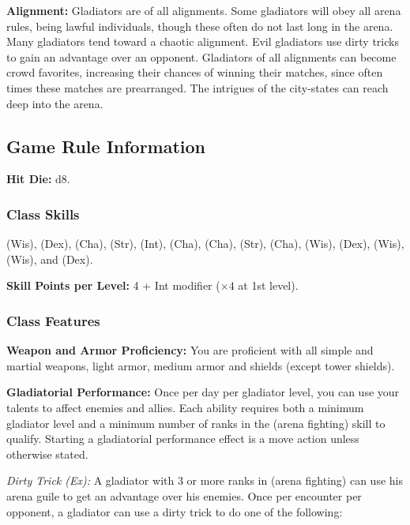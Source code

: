 \textbf{Alignment:} Gladiators are of all alignments. Some gladiators will obey all arena rules, being lawful individuals, though these often do not last long in the arena. Many gladiators tend toward a chaotic alignment. Evil gladiators use dirty tricks to gain an advantage over an opponent. Gladiators of all alignments can become crowd favorites, increasing their chances of winning their matches, since often times these matches are prearranged. The intrigues of the city-states can reach deep into the arena.

\subsection{Game Rule Information}

\textbf{Hit Die:} d8.

\subsubsection{Class Skills}
 (Wis),  (Dex),  (Cha),  (Str),  (Int),  (Cha),  (Cha),  (Str),  (Cha),  (Wis),  (Dex),  (Wis),  (Wis), and  (Dex).

\textbf{Skill Points per Level:} 4 + Int modifier ($\times4$ at 1st level).

\subsubsection{Class Features}

\textbf{Weapon and Armor Proficiency:} You are proficient with all simple and martial weapons, light armor, medium armor and shields (except tower shields).

\textbf{Gladiatorial Performance:} Once per day per gladiator level, you can use your talents to affect enemies and allies. Each ability requires both a minimum gladiator level and a minimum number of ranks in the  (arena fighting) skill to qualify. Starting a gladiatorial performance effect is a move action unless otherwise stated.

\textit{Dirty Trick (Ex):} A gladiator with 3 or more ranks in  (arena fighting) can use his arena guile to get an advantage over his enemies. Once per encounter per opponent, a gladiator can use a dirty trick to do one of the following:

